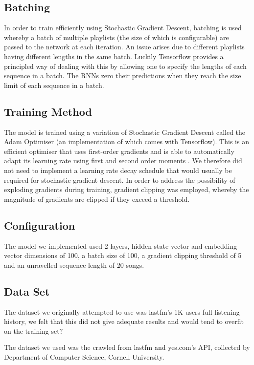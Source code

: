 \documentclass{article} %
\begin{document}
\subsection{Batching}
In order to train efficiently using Stochastic Gradient Descent, batching is used whereby a batch of multiple playlists (the size of which is configurable) are passed to the network at each iteration. An issue arises due to different playlists having different lengths in the same batch. Luckily Tensorflow provides a principled way of dealing with this by allowing one to specify the lengths of each sequence in a batch. The RNNs zero their predictions when they reach the size limit of each sequence in a batch. 

\subsection{Training Method}
The model is trained using a variation of Stochastic Gradient Descent called the Adam Optimiser (an implementation of which comes with Tensorflow). This is an efficient optimiser that uses first-order gradients and is able to automatically adapt its learning rate using first and second order moments \cite{Adams}. We therefore did not need to implement a learning rate decay schedule that would usually be required for stochastic gradient descent. In order to address the possibility of exploding gradients during training, gradient clipping was employed, whereby the magnitude of gradients are clipped if they exceed a threshold. 

\subsection{Configuration}
The model we implemented used 2 layers, hidden state vector and embedding vector dimensions of 100, a batch size of 100, a gradient clipping threshold of 5 and an unravelled sequence length of 20 songs. 

\subsection{Data Set}
The dataset we originally attempted to use was lastfm's 1K users full listening history, we felt that this did not give adequate results and would tend to overfit on the training set?

The dataset we used was the crawled from lastfm and yes.com's API, collected by Department of Computer Science, Cornell University. \cite{cornelldataset}
\end{document}
